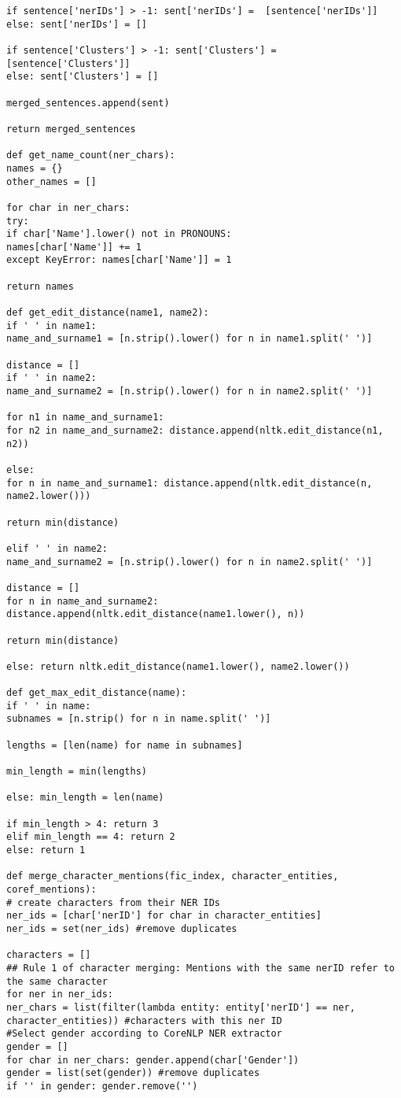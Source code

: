 \documentclass{pre-tfg}
\begin{document}
\begin{lstlisting}[style=consola]
if sentence['nerIDs'] > -1: sent['nerIDs'] =  [sentence['nerIDs']]
else: sent['nerIDs'] = []

if sentence['Clusters'] > -1: sent['Clusters'] = [sentence['Clusters']]
else: sent['Clusters'] = []

merged_sentences.append(sent)

return merged_sentences

def get_name_count(ner_chars):
names = {}
other_names = []

for char in ner_chars:
try: 
if char['Name'].lower() not in PRONOUNS:
names[char['Name']] += 1
except KeyError: names[char['Name']] = 1

return names

def get_edit_distance(name1, name2):
if ' ' in name1:
name_and_surname1 = [n.strip().lower() for n in name1.split(' ')]

distance = []
if ' ' in name2:
name_and_surname2 = [n.strip().lower() for n in name2.split(' ')]

for n1 in name_and_surname1:
for n2 in name_and_surname2: distance.append(nltk.edit_distance(n1, n2))

else:
for n in name_and_surname1: distance.append(nltk.edit_distance(n, name2.lower()))

return min(distance)

elif ' ' in name2:
name_and_surname2 = [n.strip().lower() for n in name2.split(' ')]

distance = []
for n in name_and_surname2: distance.append(nltk.edit_distance(name1.lower(), n))

return min(distance)

else: return nltk.edit_distance(name1.lower(), name2.lower())

def get_max_edit_distance(name):
if ' ' in name:
subnames = [n.strip() for n in name.split(' ')]

lengths = [len(name) for name in subnames]

min_length = min(lengths)

else: min_length = len(name)

if min_length > 4: return 3
elif min_length == 4: return 2
else: return 1

def merge_character_mentions(fic_index, character_entities, coref_mentions):
# create characters from their NER IDs
ner_ids = [char['nerID'] for char in character_entities]
ner_ids = set(ner_ids) #remove duplicates

characters = []
## Rule 1 of character merging: Mentions with the same nerID refer to the same character
for ner in ner_ids:
ner_chars = list(filter(lambda entity: entity['nerID'] == ner, character_entities)) #characters with this ner ID
#Select gender according to CoreNLP NER extractor
gender = []
for char in ner_chars: gender.append(char['Gender'])
gender = list(set(gender)) #remove duplicates
if '' in gender: gender.remove('')


\end{lstlisting}
\end{document}
